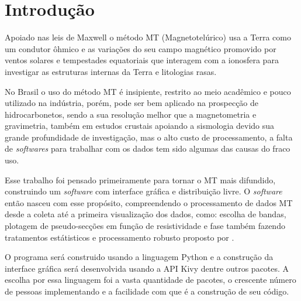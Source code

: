 

\chapter{Introdução}
    \label{cap-introducao}
    
	Apoiado nas leis de Maxwell o método MT (Magnetotelúrico) usa a Terra como 
	um condutor ôhmico e as variações do seu campo 
	magnético promovido por ventos solares \cite{parkinson93} e tempestades equatoriais 
	que interagem com a ionosfera para investigar as 
	estruturas internas da Terra e litologias rasas. 
	
	
	No Brasil o uso do método MT é insipiente, restrito ao meio acadêmico e pouco
	utilizado na indústria, porém, pode ser bem aplicado na prospecção de 
	hidrocarbonetos, sendo a sua resolução melhor que a magnetometria
	e gravimetria, também em estudos crustais
	apoiando a sismologia devido sua grande profundidade de investigação, mas o 
	alto custo de processamento, a falta de \textit{softwares} para trabalhar com os 
	dados tem sido algumas das causas do fraco uso.
	
	
	Esse trabalho foi pensado primeiramente para tornar o MT mais difundido, 
	construindo um \textit{software} com interface gráfica e 
	distribuição livre. O \textit{software} então nasceu 
	com esse propósito, compreendendo o processamento de dados
	MT desde a coleta até a primeira visualização dos dados, como: escolha 
	de bandas, plotagem de pseudo-secções em função de resistividade e fase 
	também fazendo tratamentos estátisticos e processamento robusto 
	proposto por \citeauthor{egbert97} \citeyearpar{egbert97}.
	
	
	O programa será construido usando a linguagem Python \cite{python36} 
	e a construção da interface gráfica será desenvolvida usando a API
	Kivy \cite{kivy110} dentre outros pacotes. A escolha por essa linguagem foi a vasta quantidade de pacotes,  o crescente 
	número de pessoas implementando e a facilidade com que é a construção de seu
	código.



